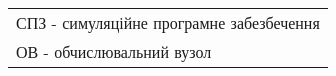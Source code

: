 
\begin{tabular}{l}
	\\СПЗ - симуляційне програмне забезбечення
	\\ОВ 	- обчислювальний вузол
\end{tabular}